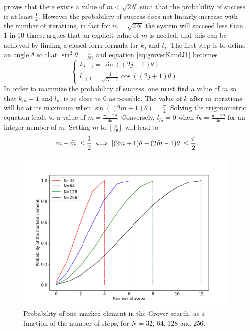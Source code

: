 \documentclass[../../dissertation.tex]{subfiles}
\begin{document}
\cite{grover1996} proves that there exists a value of $m < \sqrt{2N}$ such that
the probability of success is at least $\frac{1}{2}$. However the probability
of success does not linearly increase with the number of iterations, in fact
for $m=\sqrt{2N}$ the system will succeed less than $1$ in $10$ times.
\cite{boyer1996} argues that an explicit value of $m$ is needed, and this can be
achieved by finding a closed form formula for $k_j$ and $l_j$. The first step
is to define an angle $\theta$ so that $\sin^2\theta = \frac{1}{N}$, and
equation \eqref{eq:groverKandJ1} becomes
\begin{equation}
	\begin{cases}
		k_{j+1} = \sin{((2j+1)\theta)} 
		\\l_{j+1} = \frac{1}{\sqrt{N-1}}\cos{((2j+1)\theta)}.
	\end{cases}\label{eq:groverKandJ2}
\end{equation}
In order to maximize the probability of success, one must find a value of $m$
so that $k_m = 1$ and $l_m$ is as close to $0$ as possible. The value of $k$
after $m$ iterations will be at its maximum when $\sin{((2m+1)\theta)} =
\frac{\pi}{2}$. Solving the trigonometric equation leads to a value of $m =
\frac{\pi-2\theta}{4\theta}$. Conversely, $l_{\widetilde{m}} = 0$ when
$\widetilde{m} = \frac{\pi-2\theta}{4\theta}$ for an integer number of
$\widetilde{m}$. Setting $m$ to
$\lfloor\frac{\pi}{4\theta}\rfloor$ will lead to
\begin{equation}
	\abs{m-\widetilde{m}} \leq \frac{1}{2} \iff \abs{(2m+1)\theta - (2\widetilde{m}-1)\theta} \leq \frac{\pi}{2}.
\end{equation}
\begin{figure}[!h]
	\centering
	\includegraphics[scale=0.40]{img/Grover/GroverOneMarked3264128256}
	\caption{Probability of one marked element in the Grover search, as a function of the number of steps, for $N=32$, $64$, $128$ and $256$.} 
	\label{fig:groverOneMarked163264128}
\end{figure}
\end{document}
